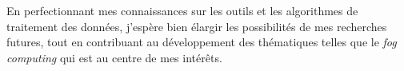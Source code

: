  En perfectionnant mes connaissances sur les outils et les algorithmes de traitement des données, j'espère bien élargir les possibilités de mes recherches futures, tout en contribuant au développement des thématiques telles que le \textit{fog computing }qui est au centre de mes intérêts.
%
%
%
%
%
%
%
%
%
%
%
%
